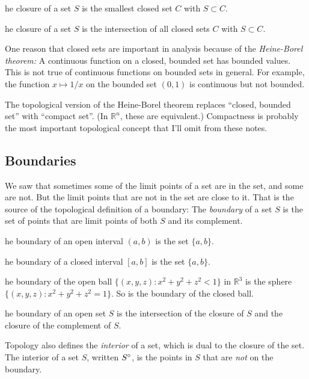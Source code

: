 \documentclass{article}
\def\R{{\mathbb R}}
\def\Rn{{\R^n}}
\newcounter{exercisecounter}\setcounter{exercisecounter}{1}
\def\Exercise.#1\par{{\item\small {\bf Exercise \number\theexercisecounter}.#1\addtocounter{exercisecounter}{1}}}
\def\inter#1{\smash{#1}^\circ\vphantom{#1}}
\begin{document}
\begin{itemize}
\Exercise. The closure of a set $S$ is the smallest closed set $C$
with $S\subset C$.

\Exercise. The closure of a set $S$ is the intersection of all closed sets $C$
with $S\subset C$.


\end{itemize}

One reason that closed sets are important in analysis because of the
{\em Heine-Borel theorem:\/} A continuous function on a closed,
bounded set has bounded values.  This is not true of continuous
functions on bounded sets in general.  For example, the function $x
\mapsto 1/x$ on the bounded set $(0, 1)$ is continuous but not
bounded.

The topological version of the Heine-Borel theorem replaces ``closed,
bounded set'' with ``compact set''.  (In $\Rn$, these are equivalent.)
Compactness is probably the most important topological concept that
I'll omit from these notes.

\subsection*{Boundaries}

We saw that sometimes some of the limit points of a set are in the
set, and some are not.  But the limit points that are not in the set
are close to it.  That is the source of the topological definition of
a boundary: The {\em boundary\/} of a set $S$ is the set of points
that are limit points of both $S$ and its complement.

\begin{itemize}
\Exercise. The boundary of an open interval $(a, b)$ is the set $\{a, b\}$.

\Exercise. The boundary of a closed interval $[a, b]$ is the set $\{a, b\}$.

\Exercise. The boundary of the open ball $\{(x,y,z) : x^2 + y^2 + z^2 <
1\}$ in $\R^3$ is the sphere  $\{(x,y,z) : x^2 + y^2 + z^2 = 1\}$.   So
is the boundary of the closed ball. 

\Exercise. The boundary of an open set $S$ is the intersection of the
closure of $S$ and the closure of the complement of $S$.

\end{itemize}

Topology also defines the {\em interior\/} of a set, which is dual to
the closure of the set.  The interior of a set $S$, written $\inter
S$, is the points in $S$ that are {\em not\/} on the boundary.
\end{document}
